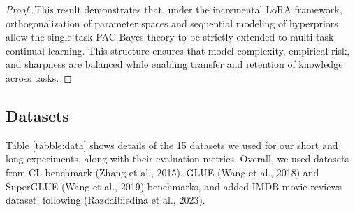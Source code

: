 \documentclass[letterpaper]{article} %
\begin{document}
\begin{proof}

 This result demonstrates that, under the incremental LoRA framework, orthogonalization of parameter spaces and sequential modeling of hyperpriors allow the single-task PAC-Bayes theory to be strictly extended to multi-task continual learning. This structure ensures that model complexity, empirical risk, and sharpness are balanced while enabling transfer and retention of knowledge across tasks.




\end{proof}






\subsection{Datasets}
Table \ref{tabble:data} shows details of the 15 datasets we used for our short and long experiments, along with their evaluation metrics. Overall, we used datasets from CL benchmark (Zhang et al., 2015), GLUE (Wang et al., 2018) and SuperGLUE (Wang et al., 2019) benchmarks, and added IMDB movie reviews dataset, following (Razdaibiedina et al., 2023).
\end{document}
